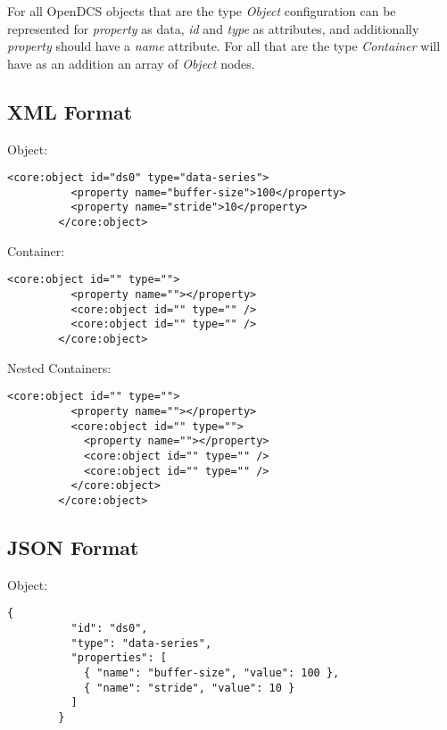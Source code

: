 \documentclass[11pt]{article}
\begin{document}
    For all OpenDCS objects that are the type \emph{Object} configuration can be
    represented for \emph{property} as data, \emph{id} and \emph{type} as
    attributes, and additionally \emph{property} should have a \emph{name}
    attribute. For all that are the type \emph{Container} will have as an
    addition an array of \emph{Object} nodes.

    \subsection{XML Format}\label{sec:cfg-xml}

      Object:

      \begin{lstlisting}[caption={Object Configuration in XML},label={lst:cfg-xml-obj}]
        <core:object id="ds0" type="data-series">
          <property name="buffer-size">100</property>
          <property name="stride">10</property>
        </core:object>
      \end{lstlisting}

      Container:

      \begin{lstlisting}[caption={Container Configuration in XML},label={lst:cfg-xml-ctr}]
        <core:object id="" type="">
          <property name=""></property>
          <core:object id="" type="" />
          <core:object id="" type="" />
        </core:object>
      \end{lstlisting}

      Nested Containers:

      \begin{lstlisting}[caption={Nested Container Configuration in XML},label={lst:cfg-xml-ctr}]
        <core:object id="" type="">
          <property name=""></property>
          <core:object id="" type="">
            <property name=""></property>
            <core:object id="" type="" />
            <core:object id="" type="" />
          </core:object>
        </core:object>
      \end{lstlisting}

    \subsection{JSON Format}\label{sec:cfg-json}

      Object:

      \begin{lstlisting}[caption={Object Configuration in JSON},label={lst:cfg-json-obj}]
        {
          "id": "ds0",
          "type": "data-series",
          "properties": [
            { "name": "buffer-size", "value": 100 },
            { "name": "stride", "value": 10 }
          ]
        }
      \end{lstlisting}
\end{document}
